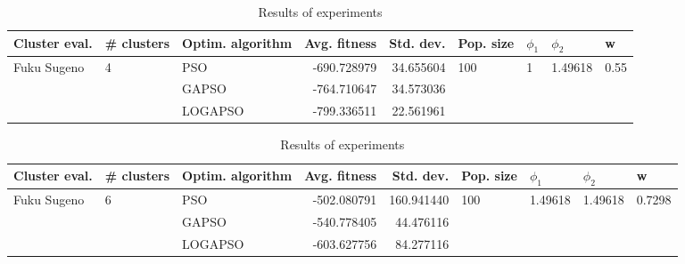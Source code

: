 \documentclass{article}
\begin{document}
\begin{table}
\centering
\caption{Results of experiments}
\begin{tabular}{lllrrllll}
\toprule
               Cluster eval. &        \# clusters & Optim. algorithm &  Avg. fitness &  Std. dev. &            Pop. size &         $\phi_{1}$ &               $\phi_{2}$ &                     w \\
\midrule
\multirow{3}{*}{Fuku Sugeno} & \multirow{3}{*}{4} &              PSO &   -690.728979 &  34.655604 & \multirow{3}{*}{100} & \multirow{3}{*}{1} & \multirow{3}{*}{1.49618} & \multirow{3}{*}{0.55} \\
                             &                    &            GAPSO &   -764.710647 &  34.573036 &                      &                    &                          &                       \\
                             &                    &          LOGAPSO &   -799.336511 &  22.561961 &                      &                    &                          &                       \\
\bottomrule
\end{tabular}
\end{table}
\begin{table}
\centering
\caption{Results of experiments}
\begin{tabular}{lllrrllll}
\toprule
               Cluster eval. &        \# clusters & Optim. algorithm &  Avg. fitness &  Std. dev. &            Pop. size &               $\phi_{1}$ &               $\phi_{2}$ &                       w \\
\midrule
\multirow{3}{*}{Fuku Sugeno} & \multirow{3}{*}{6} &              PSO &   -502.080791 & 160.941440 & \multirow{3}{*}{100} & \multirow{3}{*}{1.49618} & \multirow{3}{*}{1.49618} & \multirow{3}{*}{0.7298} \\
                             &                    &            GAPSO &   -540.778405 &  44.476116 &                      &                          &                          &                         \\
                             &                    &          LOGAPSO &   -603.627756 &  84.277116 &                      &                          &                          &                         \\
\bottomrule
\end{tabular}
\end{table}
\end{document}

